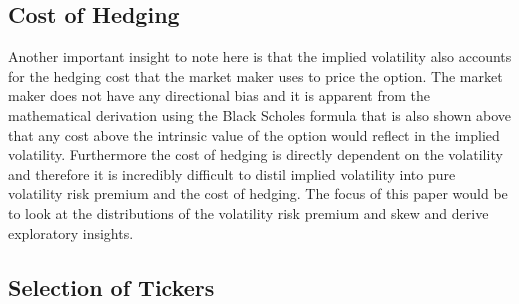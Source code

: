 \subsection{Cost of Hedging}
Another important insight to note here is that the implied volatility also accounts for the hedging cost that the market maker uses to price the option. The market maker does not have any directional bias and it is apparent from the mathematical derivation using the Black Scholes formula that is also shown above that any cost above the intrinsic value of the option would reflect in the implied volatility. Furthermore the cost of hedging is directly dependent on the volatility and therefore it is incredibly difficult to distil implied volatility into pure volatility risk premium and the cost of hedging. The focus of this paper would be to look at the distributions of the volatility risk premium and skew and derive exploratory insights.

\subsection{Selection of Tickers}


